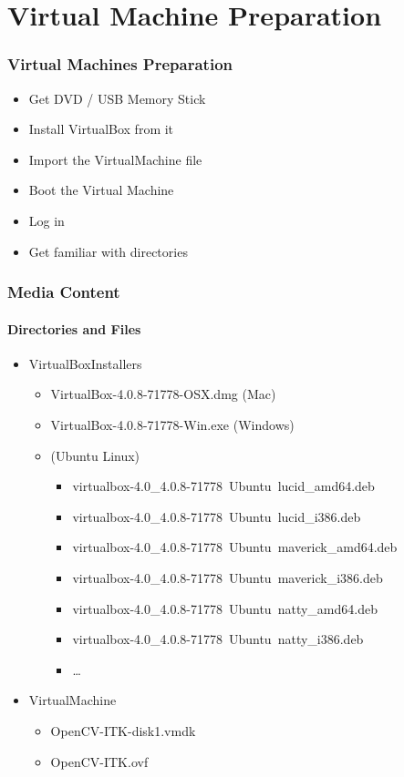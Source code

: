 \section{Virtual Machine Preparation}


\begin{frame}
\frametitle{Virtual Machines Preparation}
\begin{itemize}
\item Get DVD / USB Memory Stick
\item Install VirtualBox from it
\item Import the VirtualMachine file
\item Boot the Virtual Machine
\item Log in
\item Get familiar with directories
\end{itemize}
\end{frame}

\begin{frame}
\frametitle{Media Content}
\framesubtitle{Directories and Files}
\begin{itemize}
\item VirtualBoxInstallers
\begin{itemize}
\item VirtualBox-4.0.8-71778-OSX.dmg (Mac)
\item VirtualBox-4.0.8-71778-Win.exe (Windows)
\item (Ubuntu Linux)
\begin{itemize}
\item virtualbox-4.0\_4.0.8-71778~Ubuntu~lucid\_amd64.deb
\item virtualbox-4.0\_4.0.8-71778~Ubuntu~lucid\_i386.deb
\item virtualbox-4.0\_4.0.8-71778~Ubuntu~maverick\_amd64.deb
\item virtualbox-4.0\_4.0.8-71778~Ubuntu~maverick\_i386.deb
\item virtualbox-4.0\_4.0.8-71778~Ubuntu~natty\_amd64.deb
\item virtualbox-4.0\_4.0.8-71778~Ubuntu~natty\_i386.deb
\item \ldots
\end{itemize}
\end{itemize}
\pause
\item VirtualMachine
\begin{itemize}
\item  OpenCV-ITK-disk1.vmdk
\item  OpenCV-ITK.ovf
\end{itemize}
\end{itemize}
\end{frame}

